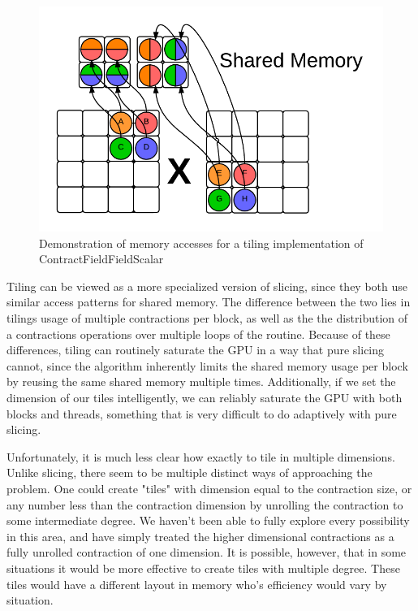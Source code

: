 \begin{figure}
    \centering
    \includegraphics[scale = .7]{ContractFieldFieldScalarGraphicTiling2}
    \caption{Demonstration of memory accesses for a tiling implementation of ContractFieldFieldScalar}
\end{figure}

    Tiling can be viewed as a more specialized version of slicing, since they
both use similar access patterns for shared memory. The difference between the
two lies in tilings usage of multiple contractions per block, as well as the
the distribution of a contractions operations over multiple loops of the
routine. Because of these differences, tiling can routinely saturate the GPU in
a way that pure slicing cannot, since the algorithm inherently limits the
shared memory usage per block by reusing the same shared memory multiple times.
Additionally, if we set the dimension of our tiles intelligently, we can
reliably saturate the GPU with both blocks and threads, something that is very
difficult to do adaptively with pure slicing. 
	
    Unfortunately, it is much less clear how exactly to tile in multiple
dimensions. Unlike slicing, there seem to be multiple distinct ways of
approaching the problem. One could create "tiles" with dimension equal to the
contraction size, or any number less than the contraction dimension by
unrolling the contraction to some intermediate degree. We haven't been able to
fully explore every possibility in this area, and have simply treated the
higher dimensional contractions as a fully unrolled contraction of one
dimension. It is possible, however, that in some situations it would be more
effective to create tiles with multiple degree. These tiles would have a
different layout in memory who's efficiency would vary by situation. 
	
